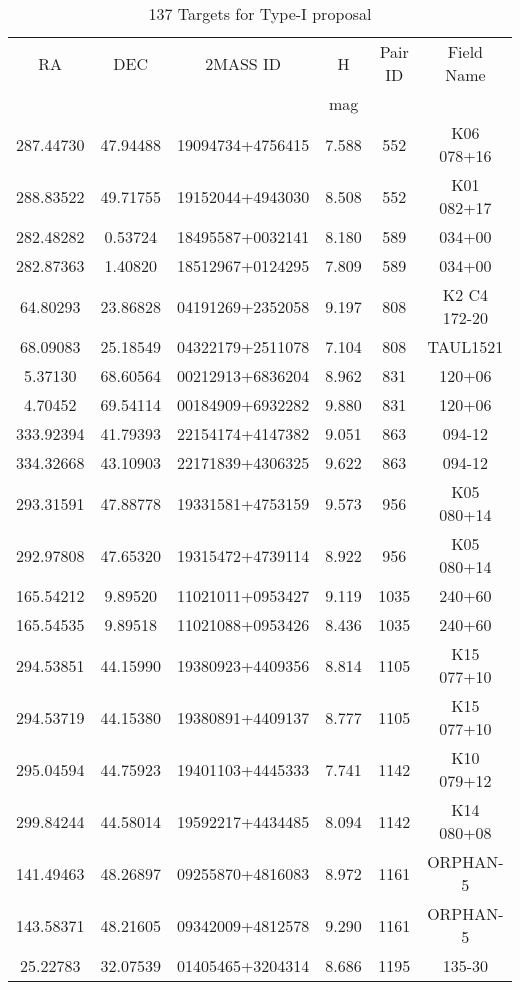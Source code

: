 \begin{longtable}{cccccc}
\caption{137 Targets for Type-I proposal}\label{tab:sample}\\
\hline\hline
RA & DEC & 2MASS ID & H & Pair ID & Field Name\\
 &  &  & mag &  & \\
\hline
287.44730 & 47.94488 & 19094734+4756415 & 7.588 & 552 & K06 078+16 \\
288.83522 & 49.71755 & 19152044+4943030 & 8.508 & 552 & K01 082+17 \\
282.48282 & 0.53724 & 18495587+0032141 & 8.180 & 589 & 034+00 \\
282.87363 & 1.40820 & 18512967+0124295 & 7.809 & 589 & 034+00 \\
64.80293 & 23.86828 & 04191269+2352058 & 9.197 & 808 & K2 C4 172-20 \\
68.09083 & 25.18549 & 04322179+2511078 & 7.104 & 808 & TAUL1521 \\
5.37130 & 68.60564 & 00212913+6836204 & 8.962 & 831 & 120+06 \\
4.70452 & 69.54114 & 00184909+6932282 & 9.880 & 831 & 120+06 \\
333.92394 & 41.79393 & 22154174+4147382 & 9.051 & 863 & 094-12 \\
334.32668 & 43.10903 & 22171839+4306325 & 9.622 & 863 & 094-12 \\
293.31591 & 47.88778 & 19331581+4753159 & 9.573 & 956 & K05 080+14 \\
292.97808 & 47.65320 & 19315472+4739114 & 8.922 & 956 & K05 080+14 \\
165.54212 & 9.89520 & 11021011+0953427 & 9.119 & 1035 & 240+60 \\
165.54535 & 9.89518 & 11021088+0953426 & 8.436 & 1035 & 240+60 \\
294.53851 & 44.15990 & 19380923+4409356 & 8.814 & 1105 & K15 077+10 \\
294.53719 & 44.15380 & 19380891+4409137 & 8.777 & 1105 & K15 077+10 \\
295.04594 & 44.75923 & 19401103+4445333 & 7.741 & 1142 & K10 079+12 \\
299.84244 & 44.58014 & 19592217+4434485 & 8.094 & 1142 & K14 080+08 \\
141.49463 & 48.26897 & 09255870+4816083 & 8.972 & 1161 & ORPHAN-5 \\
143.58371 & 48.21605 & 09342009+4812578 & 9.290 & 1161 & ORPHAN-5 \\
25.22783 & 32.07539 & 01405465+3204314 & 8.686 & 1195 & 135-30 \\

\end{longtable}
